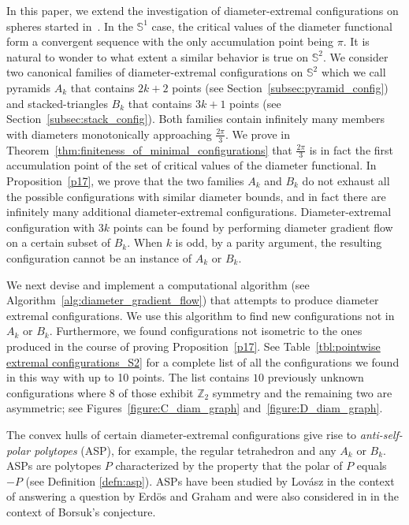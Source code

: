 \documentclass[12pt]{amsart}
\theoremstyle{plain}
\newcommand{\Sp}{\mathbb{S}}
\numberwithin{equation}{section}
\begin{document}
In this paper, we extend the investigation of diameter-extremal
configurations on spheres started in~\cite{katz1989diameter}.  In the
$\Sp^1$ case, the critical values of the diameter functional form a
convergent sequence with the only accumulation point being $\pi$.  It
is natural to wonder to what extent a similar behavior is true on
$\Sp^2$.  We consider two canonical families of diameter-extremal
configurations on $\Sp^2$ which we call pyramids $A_k$ that contains
$2k+2$ points (see Section~\ref{subsec:pyramid_config}) and
stacked-triangles $B_k$ that contains $3k+1$ points (see
Section~\ref{subsec:stack_config}).  Both families contain infinitely
many members with diameters monotonically approaching
$\frac{2\pi}{3}$.  We prove in
Theorem~\ref{thm:finiteness_of_minimal_configurations} that
$\frac{2\pi}{3}$ is in fact the first accumulation point of the set of
critical values of the diameter functional.  In Proposition~\ref{p17},
we prove that the two families $A_k$ and $B_k$ do not exhaust all the
possible configurations with similar diameter bounds, and in fact
there are infinitely many additional diameter-extremal configurations.
Diameter-extremal configuration with $3k$ points can be found by
performing diameter gradient flow on a certain subset of $B_k$.  When
$k$ is odd, by a parity argument, the resulting configuration cannot
be an instance of $A_k$ or $B_k$.

We next devise and implement a computational algorithm (see
Algorithm~\ref{alg:diameter_gradient_flow}) that attempts to produce
diameter extremal configurations.  We use this algorithm to find new
configurations not in $A_k$ or $B_k$.  Furthermore, we found
configurations not isometric to the ones produced in the course of
proving Proposition~\ref{p17}.  See Table~\ref{tbl:pointwise extremal
  configurations_S2} for a complete list of all the configurations we
found in this way with up to 10 points. The list contains
  $10$ previously unknown configurations where $8$ of those exhibit
  $\mathbb{Z}_2$ symmetry and the remaining two are asymmetric; see
  Figures~\ref{figure:C_diam_graph} and~\ref{figure:D_diam_graph}.

The convex hulls of certain diameter-extremal configurations give rise
to \emph{anti-self-polar polytopes} (ASP), for example, the regular
tetrahedron and any $A_k$ or $B_k$.  ASPs are polytopes $P$
characterized by the property that the polar of $P$ equals $-P$ (see
Definition \ref{defn:asp}).  ASPs have been studied by Lov\'{a}sz in
the context of answering a question by Erd\"os and Graham
\cite{lovasz1983self} and were also considered in \cite[Section
  5]{katz1989diameter} in the context of Borsuk's conjecture.
\end{document}

